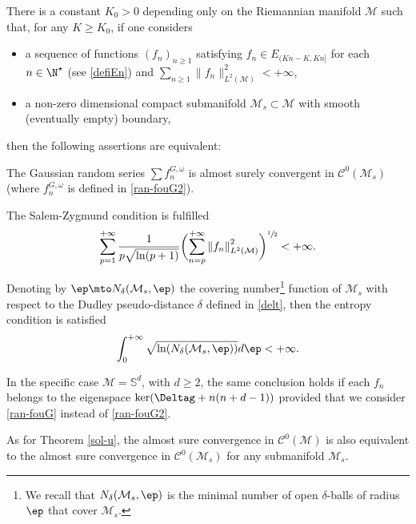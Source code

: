 \begin{theo}\label{sol}
There is a constant $K_0>0$ depending only on the Riemannian manifold $\mathcal{M}$ such that, for any $K\geq K_0$, if one considers
\begin{itemize}
\item a sequence of functions $(f_n)_{n\geq 1}$ satisfying $f_n\in E_{(Kn-K,Kn]}$ for each $n\in \N^\star$ (see \eqref{defiEn}) and $\sum_{n\geq 1}\|f_n\|_{L^2(\mathcal{M})}^2<+\infty$,
\item a non-zero dimensional compact submanifold $\mathcal{M}_s\subset \mathcal{M}$ with smooth (eventually empty) boundary,
\end{itemize}
then the following assertions are equivalent:
\begin{enumeratei}
\item\label{soli} The Gaussian random series $\sum f_n^{G,\omega}$ is almost surely convergent in $\mathcal{C}^0(\mathcal{M}_s)$ (where $f_n^{G,\omega}$ is defined in \eqref{ran-fouG2}).
\item\label{solii} The Salem-Zygmund condition is fulfilled
\begin{equation}\label{pz-con3}
\sum_{p=1}^{+\infty} \frac{1}{p\sqrt{\ln(p+1)}}\biggl(\sum_{n=p}^{+\infty} \left\Vert f_n\right\Vert_{L^2(\mathcal{M})}^2 \biggr)^{\sfrac{1}{2}}<+\infty.
\end{equation}
\item\label{soliii} Denoting by $\ep\mto N_{\delta}(\mathcal{M}_s,\ep)$ the covering number\footnote{We recall that $N_{\delta}(\mathcal{M}_s,\ep)$ is the minimal number of open $\delta$-balls of radius $\ep$ that cover $\mathcal{M}_s$.} function of $\mathcal{M}_s$ with respect to the Dudley pseudo-distance
$\delta$ defined in \eqref{delt}, then the entropy condition is satisfied%
\begin{equation}\label{sol-ent}
\int_{0}^{+\infty} \sqrt{\ln(N_{\delta}(\mathcal{M}_s,\ep))} d\ep <+\infty.
\end{equation}
\end{enumeratei}
\item[] In the specific case $\mathcal{M}=\mathbb{S}^d$, with $d\geq 2$, the same conclusion holds if each $f_n$ belongs to the eigenspace $\ker(\Deltag+n(n+d-1))$ provided that we consider \eqref{ran-fouG} instead of \eqref{ran-fouG2}.
\end{theo}
As for Theorem \ref{sol-u}, the almost sure convergence in $\mathcal{C}^0(\mathcal{M})$ is also equivalent to the almost sure convergence in $\mathcal{C}^0(\mathcal{M}_s)$ for any submanifold $\mathcal{M}_s$.

